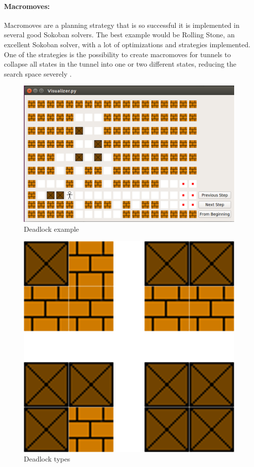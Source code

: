 \documentclass[12pt,a4paper,oneside]{report}
\begin{document}
\paragraph{Macromoves:} Macromoves are a planning strategy that is so successful it is implemented in several good Sokoban solvers. The best example would be Rolling Stone, an excellent Sokoban solver, with a lot of optimizations and strategies implemented. One of the strategies is the possibility to create macromoves for tunnels to collapse all states in the tunnel into one or two different states, reducing the search space severely \cite{SokoRelevanceCuts}.
\begin{figure}[ht]
\centering
\includegraphics[scale=0.2]{flipped,deadlockexample}
\caption{Deadlock example}
\label{fig:2}
\end{figure}
\begin{figure}[ht]
\centering
\includegraphics[scale=0.2]{deadlocktypes}
\caption{Deadlock types}
\label{fig:3}
\end{figure}
\end{document}
